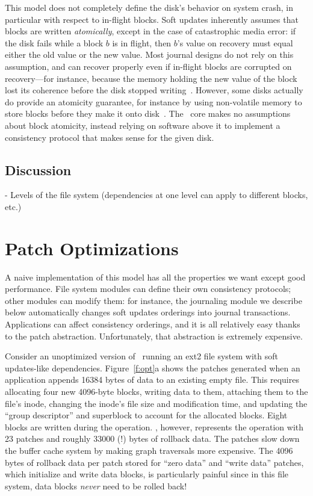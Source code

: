 This model does not completely define the disk's behavior on system crash,
 in particular with respect to in-flight blocks.
%
Soft updates inherently assumes that blocks are written
\emph{atomically}, except in the case of catastrophic media error:
%
if the disk fails while a block $b$ is in flight, then $b$'s
value on recovery must equal either the old value or the new value.
%
Most journal designs do not rely on this assumption, and can recover
 properly even if in-flight blocks are corrupted on recovery---for instance,
 because the memory holding the new value of the block lost its coherence
 before the disk stopped writing~\cite{tso}.
%
However, some disks actually do provide an atomicity guarantee, for
 instance by using non-volatile memory to store blocks before they make it
 onto disk~\cite{???}.
%
The \Kudos\ core makes no assumptions about block atomicity, instead relying
 on software above it to implement a consistency protocol that makes sense
 for the given disk.






\subsection{Discussion}

- Levels of the file system (dependencies at one level can apply to
  different blocks, etc.)



\section{Patch Optimizations}
\label{sec:patch:challenges}

A naive implementation of this model has all the properties we want except
good performance.
%
File system modules can define their own consistency protocols; other
modules can modify them: for instance, the journaling module we describe
below automatically changes soft updates orderings into journal
transactions.
%
Applications can affect consistency orderings, and it is all relatively
easy thanks to the patch abstraction.
%
Unfortunately, that abstraction is extremely expensive.


Consider an unoptimized version of \Kudos\ running an ext2 file system with
soft updates-like dependencies.
%
Figure~\ref{f:opt}a shows the patches generated when an application appends
16384 bytes of data to an existing empty file.
%
This requires allocating four new 4096-byte blocks, writing data to them,
attaching them to the file's inode, changing the inode's file size and
modification time, and updating the ``group descriptor'' and superblock to
account for the allocated blocks.
%
Eight blocks are written during the operation.
%
\Kudos, however, represents the operation with 23 patches and roughly 33000
(!) bytes of rollback data.
%
The patches slow down the buffer cache system by making graph traversals
more expensive.
%
The 4096 bytes of rollback data per patch stored for ``zero data'' and
``write data'' patches, which initialize and write data blocks, is
particularly painful since in this file system, data blocks \emph{never}
need to be rolled back!


